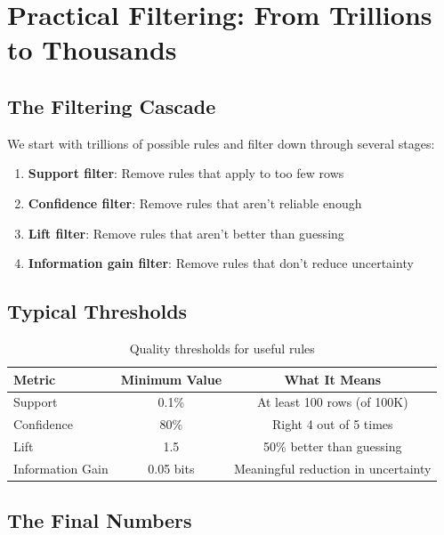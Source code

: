 \documentclass[11pt,a4paper]{article}
\begin{document}
\section{Practical Filtering: From Trillions to Thousands}

\subsection{The Filtering Cascade}

We start with trillions of possible rules and filter down through several stages:

\begin{enumerate}
    \item \textbf{Support filter}: Remove rules that apply to too few rows
    \item \textbf{Confidence filter}: Remove rules that aren't reliable enough
    \item \textbf{Lift filter}: Remove rules that aren't better than guessing
    \item \textbf{Information gain filter}: Remove rules that don't reduce uncertainty
\end{enumerate}

\subsection{Typical Thresholds}

\begin{table}[h]
\centering
\caption{Quality thresholds for useful rules}
\begin{tabular}{@{}lcc@{}}
\toprule
\textbf{Metric} & \textbf{Minimum Value} & \textbf{What It Means} \\
\midrule
Support & 0.1\% & At least 100 rows (of 100K) \\
Confidence & 80\% & Right 4 out of 5 times \\
Lift & 1.5 & 50\% better than guessing \\
Information Gain & 0.05 bits & Meaningful reduction in uncertainty \\
\bottomrule
\end{tabular}
\label{tab:thresholds}
\end{table}

\subsection{The Final Numbers}
\end{document}
